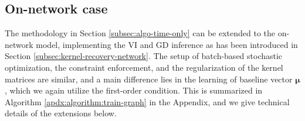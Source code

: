 \documentclass[11pt]{article}
\theoremstyle{remark}
\theoremstyle{plain}
\begin{document}
\subsection{On-network case}\label{subsec:algo-on-network}

The methodology in Section \ref{subsec:algo-time-only} can be extended to the on-network model, implementing the VI and GD inference as has been introduced in Section \ref{subsec:kernel-recovery-network}. 
The setup of batch-based stochastic optimization, the constraint enforcement, and the regularization of the kernel matrices are similar, and a main difference lies in the learning of baseline vector $\boldsymbol \mu$, which we again utilize the first-order condition.
This is summarized in Algorithm \ref{apdx:algorithm:train-graph} in the Appendix, and we give technical details of the extensions below.
\end{document}
